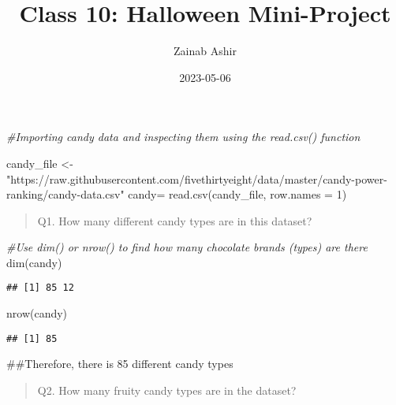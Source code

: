 \documentclass[
]{article}
\title{Class 10: Halloween Mini-Project}
\author{Zainab Ashir}
\date{2023-05-06}
\newenvironment{Shaded}{\begin{snugshade}}{\end{snugshade}}
\newcommand{\AttributeTok}[1]{\textcolor[rgb]{0.77,0.63,0.00}{#1}}
\newcommand{\CommentTok}[1]{\textcolor[rgb]{0.56,0.35,0.01}{\textit{#1}}}
\newcommand{\DecValTok}[1]{\textcolor[rgb]{0.00,0.00,0.81}{#1}}
\newcommand{\FunctionTok}[1]{\textcolor[rgb]{0.00,0.00,0.00}{#1}}
\newcommand{\NormalTok}[1]{#1}
\newcommand{\OtherTok}[1]{\textcolor[rgb]{0.56,0.35,0.01}{#1}}
\newcommand{\SpecialCharTok}[1]{\textcolor[rgb]{0.00,0.00,0.00}{#1}}
\newcommand{\StringTok}[1]{\textcolor[rgb]{0.31,0.60,0.02}{#1}}
\begin{document}
\maketitle

\begin{Shaded}
\begin{Highlighting}[]
\CommentTok{\#Importing candy data and inspecting them using the read.csv() function}

\NormalTok{candy\_file }\OtherTok{\textless{}{-}} \StringTok{"https://raw.githubusercontent.com/fivethirtyeight/data/master/candy{-}power{-}ranking/candy{-}data.csv"}
\NormalTok{candy}\OtherTok{=} \FunctionTok{read.csv}\NormalTok{(candy\_file, }\AttributeTok{row.names =} \DecValTok{1}\NormalTok{)}
\end{Highlighting}
\end{Shaded}

\begin{quote}
Q1. How many different candy types are in this dataset?
\end{quote}

\begin{Shaded}
\begin{Highlighting}[]
\CommentTok{\#Use dim() or nrow() to find how many chocolate brands (types) are there }
\FunctionTok{dim}\NormalTok{(candy)}
\end{Highlighting}
\end{Shaded}

\begin{verbatim}
## [1] 85 12
\end{verbatim}

\begin{Shaded}
\begin{Highlighting}[]
\FunctionTok{nrow}\NormalTok{(candy)}
\end{Highlighting}
\end{Shaded}

\begin{verbatim}
## [1] 85
\end{verbatim}

\#\#Therefore, there is 85 different candy types

\begin{quote}
Q2. How many fruity candy types are in the dataset?
\end{quote}

\begin{Shaded}
\end{Shaded}
\end{document}
